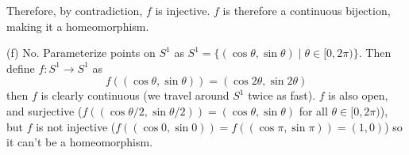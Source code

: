 \documentclass[a4paper, 11pt]{article}
\begin{document}
\begin{solution}
    Therefore, by contradiction, $f$ is injective. $f$ is therefore a continuous bijection, making it a homeomorphism.

    (f) No. Parameterize points on $S^1$ as $S^1 = \{(\cos \theta, \sin \theta)\mid \theta \in [0, 2\pi)\}$. Then define $f: S^1 \to S^1$ as \[
    f((\cos \theta, \sin \theta)) = (\cos 2\theta, \sin 2\theta)
    \]
    then $f$ is clearly continuous (we travel around $S^1$ twice as fast). $f$ is also open, and surjective ($f((\cos \theta/2, \sin \theta/2)) = (\cos \theta, \sin \theta)$ for all $\theta \in [0, 2\pi) $), but $f$ is not injective ($f((\cos 0, \sin 0)) = f((\cos \pi, \sin \pi)) = (1, 0)$) so it can't be a homeomorphism.
\end{solution}
\end{document}
